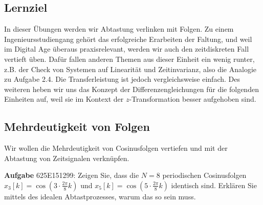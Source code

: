 \subsection*{Lernziel}
In dieser Übungen werden wir Abtastung verlinken mit Folgen.
Zu einem Ingenieursstudiengang gehört das erfolgreiche Erarbeiten
der Faltung, und weil im Digital Age überaus praxisrelevant,
werden wir auch den zeitdiskreten Fall vertieft üben.
Dafür fallen anderen Themen aus dieser Einheit ein wenig runter, z.B.
der Check von Systemen auf Linearität und Zeitinvarianz, also die Analogie zu
Aufgabe 2.4. Die Transferleistung ist jedoch vergleichsweise einfach.
Des weiteren heben wir uns das Konzept der Differenzengleichungen für die folgenden
Einheiten auf, weil sie im Kontext der $z$-Transformation besser aufgehoben sind.


\newpage
\subsection{Mehrdeutigkeit von Folgen}
\label{sec:625E151299}
\begin{Ziel}
Wir wollen die Mehrdeutigkeit von Cosinusfolgen vertiefen und mit
der Abtastung von Zeitsignalen verknüpfen.
\end{Ziel}
\textbf{Aufgabe} {\tiny 625E151299}: Zeigen Sie, dass die $N=8$ periodischen
Cosinusfolgen $x_3[k] = \cos(3\cdot\frac{2\pi}{8}k)$ und
$x_5[k] = \cos(5\cdot\frac{2\pi}{8}k)$
identisch sind.
%
Erklären Sie mittels des idealen Abtastprozesses, warum das so sein muss.
%
\begin{center}
\end{center}

